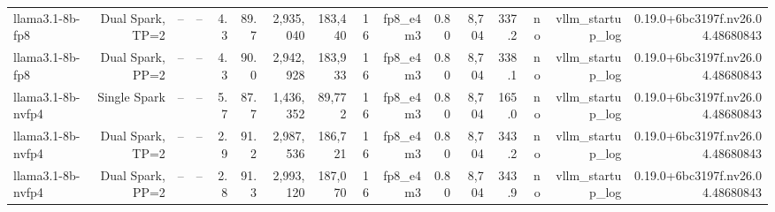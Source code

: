 \begin{tabular}{l r r r r r r r r r r r r r r r }
llama3.1-8b-fp8 & Dual Spark, TP=2 & -- & -- & 4.3 & 89.7 & 2,935,040 & 183,440 & 16 & fp8\_e4m3 & 0.80 & 8,704 & 337.2 & no & vllm\_startup\_log & 0.19.0+6bc3197f.nv26.04.48680843 \\
llama3.1-8b-fp8 & Dual Spark, PP=2 & -- & -- & 4.3 & 90.0 & 2,942,928 & 183,933 & 16 & fp8\_e4m3 & 0.80 & 8,704 & 338.1 & no & vllm\_startup\_log & 0.19.0+6bc3197f.nv26.04.48680843 \\
llama3.1-8b-nvfp4 & Single Spark & -- & -- & 5.7 & 87.7 & 1,436,352 & 89,772 & 16 & fp8\_e4m3 & 0.80 & 8,704 & 165.0 & no & vllm\_startup\_log & 0.19.0+6bc3197f.nv26.04.48680843 \\
llama3.1-8b-nvfp4 & Dual Spark, TP=2 & -- & -- & 2.9 & 91.2 & 2,987,536 & 186,721 & 16 & fp8\_e4m3 & 0.80 & 8,704 & 343.2 & no & vllm\_startup\_log & 0.19.0+6bc3197f.nv26.04.48680843 \\
llama3.1-8b-nvfp4 & Dual Spark, PP=2 & -- & -- & 2.8 & 91.3 & 2,993,120 & 187,070 & 16 & fp8\_e4m3 & 0.80 & 8,704 & 343.9 & no & vllm\_startup\_log & 0.19.0+6bc3197f.nv26.04.48680843 \\
\bottomrule
\end{tabular}
